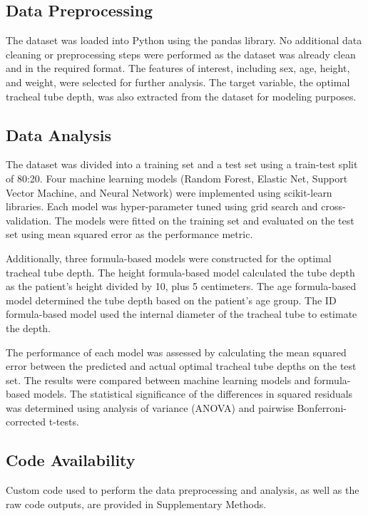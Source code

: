 \documentclass[11pt]{article}
\begin{document}
\subsection*{Data Preprocessing}
The dataset was loaded into Python using the pandas library. No additional data cleaning or preprocessing steps were performed as the dataset was already clean and in the required format. The features of interest, including sex, age, height, and weight, were selected for further analysis. The target variable, the optimal tracheal tube depth, was also extracted from the dataset for modeling purposes.

\subsection*{Data Analysis}
The dataset was divided into a training set and a test set using a train-test split of 80:20. Four machine learning models (Random Forest, Elastic Net, Support Vector Machine, and Neural Network) were implemented using scikit-learn libraries. Each model was hyper-parameter tuned using grid search and cross-validation. The models were fitted on the training set and evaluated on the test set using mean squared error as the performance metric.

Additionally, three formula-based models were constructed for the optimal tracheal tube depth. The height formula-based model calculated the tube depth as the patient's height divided by 10, plus 5 centimeters. The age formula-based model determined the tube depth based on the patient's age group. The ID formula-based model used the internal diameter of the tracheal tube to estimate the depth.

The performance of each model was assessed by calculating the mean squared error between the predicted and actual optimal tracheal tube depths on the test set. The results were compared between machine learning models and formula-based models. The statistical significance of the differences in squared residuals was determined using analysis of variance (ANOVA) and pairwise Bonferroni-corrected t-tests.\subsection*{Code Availability}

Custom code used to perform the data preprocessing and analysis, as well as the raw code outputs, are provided in Supplementary Methods.


\clearpage
\appendix
\end{document}
